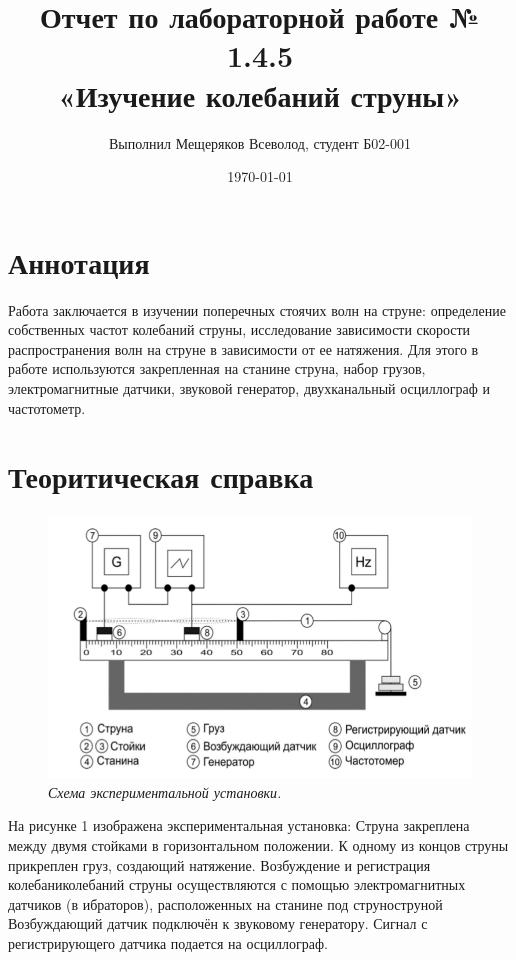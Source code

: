 \documentclass[a4paper,12pt]{report}
\author{Выполнил Мещеряков Всеволод, студент Б02-001}
\title{Отчет по лабораторной работе № 1.4.5 \\[15pt] «Изучение колебаний струны»}
\date{\today}
\begin{document}
\maketitle

\section*{Аннотация}

Работа заключается в изучении поперечных стоячих волн на струне: определение собственных частот колебаний струны, исследование зависимости скорости распространения волн на струне в зависимости от ее натяжения. Для этого в работе используются закрепленная на станине струна, набор грузов, электромагнитные датчики, звуковой генератор, двухканальный осциллограф и частотометр.

\section*{Теоритическая справка}

\begin{figure}[h]
	\includegraphics[scale=0.8]{lab145ris1.png}
	\caption{\textit{Схема экспериментальной установки.}}
\end{figure}

На рисунке 1 изображена экспериментальная установка: Струна закреплена между двумя стойками в горизонтальном положении. К одному из концов струны прикреплен груз, создающий натяжение. Возбуждение и регистрация колебаниколебаний струны осуществляются с помощью электромагнитных датчиков (в ибраторов), расположенных на станине под струноструной Возбуждающий датчик подключён к звуковому генератору. Сигнал с
регистрирующего датчика подается на осциллограф.
\end{document}
